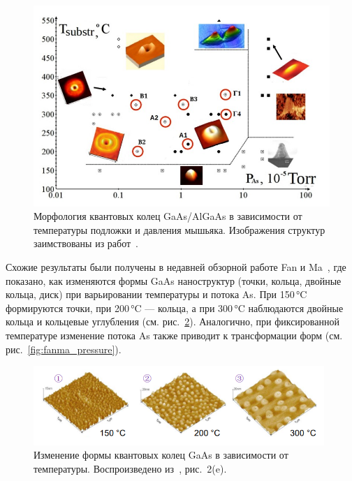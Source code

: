 \documentclass[14pt,oneside]{extarticle}
\begin{document}
\begin{figure}[H]
    \begin{center}
        \includegraphics[width=14cm]{images/morphology_map.png}
        \caption{\label{fig:morph_map}
            Морфология квантовых колец GaAs/AlGaAs в зависимости от температуры подложки и давления мышьяка. Изображения структур заимствованы из работ~\cite{mano2005nano, koguchi2005growth, vasilevskiy2013}.}
    \end{center}
\end{figure}

Схожие результаты были получены в недавней обзорной работе Fan и Ma~\cite{fan2023}, где показано, как изменяются формы GaAs наноструктур (точки, кольца, двойные кольца, диск) при варьировании температуры и потока As. При 150 °C формируются точки, при 200 °C — кольца, а при 300 °C наблюдаются двойные кольца и кольцевые углубления (см. рис.~\ref{fig:fanma_temp}). Аналогично, при фиксированной температуре изменение потока As также приводит к трансформации форм (см. рис.~\ref{fig:fanma_pressure}).

\begin{figure}[H]
    \begin{center}
        \includegraphics[width=11cm]{images/fanma_fig2e_left.png}
        \caption{\label{fig:fanma_temp}
            Изменение формы квантовых колец GaAs в зависимости от температуры. Воспроизведено из~\cite{fan2023}, рис.~2(e).}
    \end{center}
\end{figure}
\end{document}
